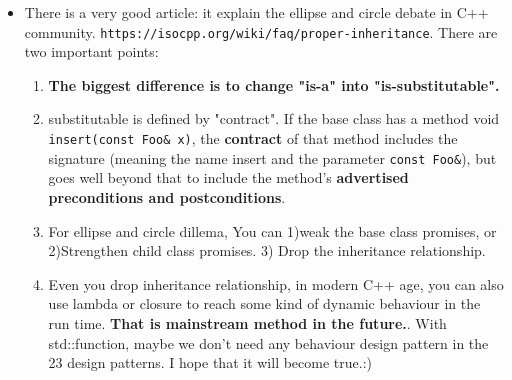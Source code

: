 \documentclass[a4paper,11pt,twoside]{book}
\begin{document}
\begin{itemize}
    \item There is a very good article: it explain the ellipse and circle debate in C++ community. \verb=https://isocpp.org/wiki/faq/proper-inheritance=. There are two important points:

        \begin{enumerate}
            \item \textbf{The biggest difference is to change "is-a" into "is-substitutable". }

            \item substitutable is defined by "contract". If the base class has a method void \texttt{insert(const Foo\& x)}, the \textbf{contract} of that method includes the signature (meaning the name insert and the parameter \texttt{const Foo\&}), but goes well beyond that to include the method’s \textbf{advertised preconditions and postconditions}. 

            \item For ellipse and circle dillema, You can 1)weak the base class promises, or 2)Strengthen child class promises. 3) Drop the inheritance relationship. 

            \item Even you drop inheritance relationship, in modern C++ age, you can also use lambda or closure to reach some kind of dynamic behaviour in the run time. \textbf{That is mainstream method in the future.}. With std::function, maybe we don't need any behaviour design pattern in the 23 design patterns. I hope that it will become true.:)
        \end{enumerate}

\end{itemize}
\end{document}
